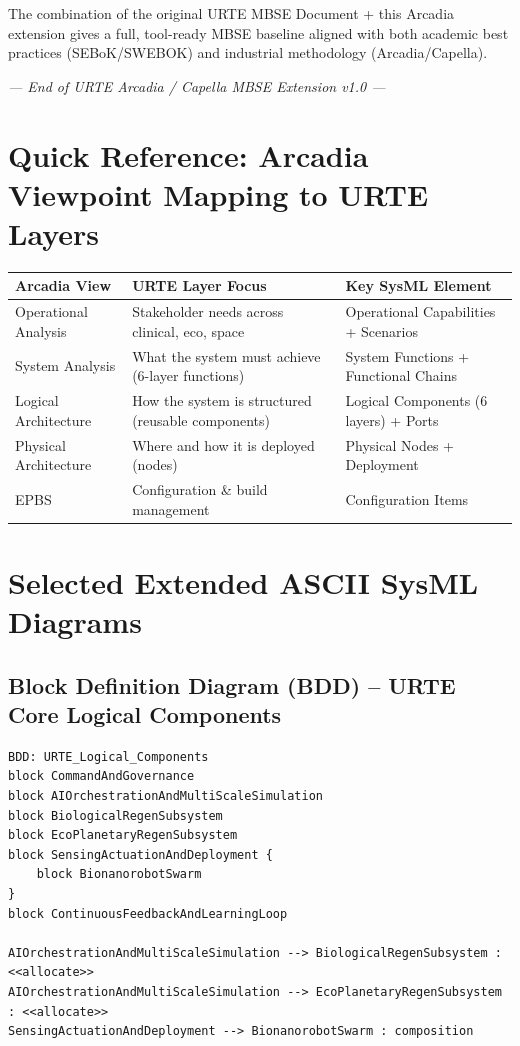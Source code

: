 \documentclass[11pt,a4paper]{report}
\begin{document}
The combination of the original URTE MBSE Document + this Arcadia extension gives a full, tool-ready MBSE baseline aligned with both academic best practices (SEBoK/SWEBOK) and industrial methodology (Arcadia/Capella).

\vspace{0.8cm}
\begin{center}
\textit{--- End of URTE Arcadia / Capella MBSE Extension v1.0 ---}
\end{center}

\appendix

\chapter{Quick Reference: Arcadia Viewpoint Mapping to URTE Layers}

\begin{tabular}{p{4cm}p{5cm}p{5cm}}
\toprule
\textbf{Arcadia View} & \textbf{URTE Layer Focus} & \textbf{Key SysML Element} \\
\midrule
Operational Analysis & Stakeholder needs across clinical, eco, space & Operational Capabilities + Scenarios \\
System Analysis & What the system must achieve (6-layer functions) & System Functions + Functional Chains \\
Logical Architecture & How the system is structured (reusable components) & Logical Components (6 layers) + Ports \\
Physical Architecture & Where and how it is deployed (nodes) & Physical Nodes + Deployment \\
EPBS & Configuration \& build management & Configuration Items \\
\bottomrule
\end{tabular}

\chapter{Selected Extended ASCII SysML Diagrams}

\section{Block Definition Diagram (BDD) -- URTE Core Logical Components}

\begin{lstlisting}[style=sysmlstyle]
BDD: URTE_Logical_Components
block CommandAndGovernance
block AIOrchestrationAndMultiScaleSimulation
block BiologicalRegenSubsystem
block EcoPlanetaryRegenSubsystem
block SensingActuationAndDeployment {
    block BionanorobotSwarm
}
block ContinuousFeedbackAndLearningLoop

AIOrchestrationAndMultiScaleSimulation --> BiologicalRegenSubsystem : <<allocate>>
AIOrchestrationAndMultiScaleSimulation --> EcoPlanetaryRegenSubsystem : <<allocate>>
SensingActuationAndDeployment --> BionanorobotSwarm : composition
\end{lstlisting}
\end{document}
